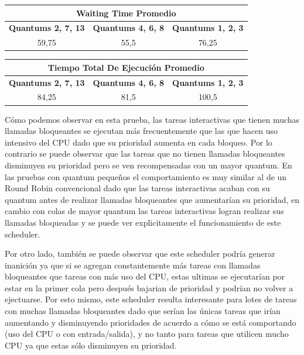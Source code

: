 \begin{center}
	\begin{tabular}{|c|c|c|}
		\hline
		\multicolumn{3}{|c|}{\large{\textbf{Waiting Time Promedio}}} \\
		\hline
		\textbf{Quantums 2, 7, 13} & \textbf{Quantums 4, 6, 8} & \textbf{Quantums 1, 2, 3} \\
		\hline
		59,75 & 55,5 & 76,25 \\
		\hline
	\end{tabular}
\end{center}

\begin{center}
	\begin{tabular}{|c|c|c|}
		\hline
		\multicolumn{3}{|c|}{\large{\textbf{Tiempo Total De Ejecución Promedio}}} \\
		\hline
		\textbf{Quantums 2, 7, 13} & \textbf{Quantums 4, 6, 8} & \textbf{Quantums 1, 2, 3} \\
		\hline
		84,25 & 81,5 & 100,5 \\
		\hline
	\end{tabular}
\end{center}

Cómo podemos observar en esta prueba, las tareas interactivas que tienen muchas llamadas bloqueantes se ejecutan más frecuentemente que las que hacen uso intensivo del CPU dado que su prioridad aumenta en cada bloqueo. Por lo contrario se puede observar que las tareas que no tienen llamadas bloqueantes disminuyen su prioridad pero se ven recompensadas con un mayor quantum. En las pruebas con quantum pequeños el comportamiento es muy similar al de un Round Robin convencional dado que las tareas interactivas acaban con su quantum antes de realizar llamadas bloqueantes que aumentarían su prioridad, en cambio con colas de mayor quantum las tareas interactivas logran realizar sus llamadas bloqueadas y se puede ver explicitamente el funcionamiento de este scheduler.

Por otro lado, también se puede observar que este scheduler podría generar inanición ya que si se agregan constantemente más tareas con llamadas bloqueantes que tareas con más uso del CPU, estas ultimas se ejecutarían por estar en la primer cola pero después bajarian de prioridad y podrían no volver a ejectuarse.
Por esto mismo, este scheduler resulta interesante para lotes de tareas con muchas llamadas bloqueantes dado que serían las únicas tareas que irían aumentando y disminuyendo prioridades de acuerdo a cómo se está comportando (uso del CPU o con entrada/salida), y no tanto para tareas que utilicen mucho CPU ya que estas sólo disminuyen su prioridad.